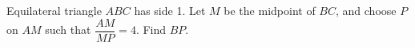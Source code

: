Equilateral triangle $ABC$ has side 1. Let $M$ be the midpoint of $BC$, and choose $P$ on $AM$ such that $\dfrac{AM}{MP}=4$. Find $BP$.
